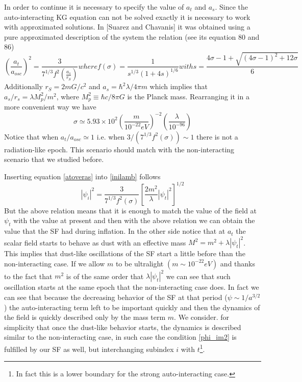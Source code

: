 \documentclass[twocolumn,           %
               showpacs,            %
               preprintnumbers,     %
               aps,                 %
               prl,          	    %
               letterpaper,             %
               superscriptaddress,      %
               nofootinbib,         %
               tightenlines,        %
               floats,floatfix      %
               ,usenatbib,
               ]{revtex4-1}
\begin{document}
In order to continue it is necessary to specify the value of $a_t$ and $a_s$. Since the auto-interacting KG equation can not be solved exactly it is necessary to work with approximated solutions. In [Suarez and Chavanis] it was obtained using a pure approximated description of the system the relation (see its equation 80 and 86)
\begin{subequations}
\begin{equation}\label{atoveras}
\left(\frac{a_t}{a_{osc}}\right)^2=\frac{3}{7^{1/3}f^2(\frac{a_s}{r_S})}
\end{equation}
where 
\begin{equation}
f(\sigma)=\frac{1}{s^{1/3}(1+4s)^{1/6}}
\end{equation}
with
\begin{equation}
s=\frac{4\sigma-1+\sqrt{(4\sigma-1)^2+12\sigma}}{6}
\end{equation}
\end{subequations}
Additionally $r_S=2mG/c^2$ and $a_s=\hbar^2\lambda/4\pi m$ which implies that $a_s/r_s=\lambda M_p^2/m^2$, where $M_p^2\equiv\hbar c/8\pi G$ is the Planck mass. Rearranging it in a more convenient way we have
\begin{equation}
\sigma \simeq 5.93\times 10^{
2}\left(\frac{m}{10^{-22}eV}\right)^{-2}\left(\frac{\lambda}{10^{-96}}\right)
\end{equation}
Notice that when $a_t/a_{osc}\simeq 1$ i.e. when $3/(7^{1/3}f^2(\sigma))\sim 1$ there is not a radiation-like epoch. This scenario should match with the non-interacting scenario that we studied before.

Inserting equation \eqref{atoveras} into \eqref{inilamb} follows
\begin{equation}\label{inilamb2}
|\psi_i|^2=\frac{3}{7^{1/3}f^2(\sigma)}\left[\frac{2m^2}{\lambda}|\psi_t|^2\right]^{1/2}
\end{equation}
But the above relation means that it is enough to match the value of the field at $\psi_t$ with the value at present and then with the above relation we can obtain the value that the SF had during inflation. In the other side notice that at $a_t$ the scalar field starts to behave as dust with an effective mass $M^2=m^2+\lambda|\psi_t|^2$. This implies that dust-like oscillations of the SF start a little before than the non-interacting case. If we allow $m$ to be ultralight $(m\sim 10^{-22}eV)$ and thanks to the fact that $m^2$ is of the same order that $\lambda|\psi_t|^2$ we can see that such oscillation starts at the same epoch that the non-interacting case does. In fact we can see that because the decreasing behavior of the SF at that period ($\psi\sim 1/a^{3/2}$) the auto-interacting term left to be important quickly and then the dynamics of the field is quickly described only by the mass term $m$. We consider. for simplicity that once the dust-like behavior starts, the dynamics is described similar to  the non-interacting case, in such case the condition \eqref{phi_im2} is fulfilled by our SF as well, but interchanging subindex $i$ with $t$\footnote{In fact this is a lower boundary for the strong auto-interacting case.}.
\\
\end{document}

